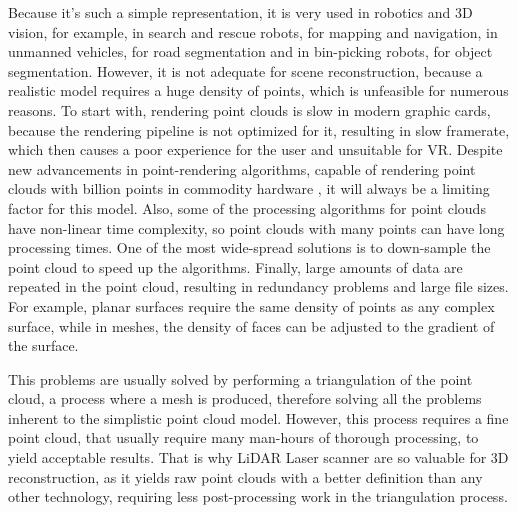 Because it's such a simple representation, it is very used in robotics and 3D vision, for example, in search and rescue robots, for mapping and navigation, in unmanned vehicles, for road segmentation and in bin-picking robots, for object segmentation. However, it is not adequate for scene reconstruction, because a realistic model requires a huge density of points, which is unfeasible for numerous reasons. To start with, rendering point clouds is slow in modern graphic cards, because the rendering pipeline is not optimized for it, resulting in slow framerate, which then causes a poor experience for the user and unsuitable for VR. Despite new advancements in point-rendering algorithms, capable of rendering point clouds with billion points in commodity hardware \cite{wimmer2006}, it will always be a limiting factor for this model. Also, some of the processing algorithms for point clouds have non-linear time complexity, so point clouds with many points can have long processing times. One of the most wide-spread solutions is to down-sample the point cloud to speed up the algorithms. Finally, large amounts of data are repeated in the point cloud, resulting in redundancy problems and large file sizes. For example, planar surfaces require the same density of points as any complex surface, while in meshes, the density of faces can be adjusted to the gradient of the surface.

This problems are usually solved by performing a triangulation of the point cloud, a process where a mesh is produced, therefore solving all the problems inherent to the simplistic point cloud model. However, this process requires a fine point cloud, that usually require many man-hours of thorough processing, to yield acceptable results. That is why LiDAR Laser scanner are so valuable for 3D reconstruction, as it yields raw point clouds with a better definition than any other technology, requiring less post-processing work in the triangulation process.
